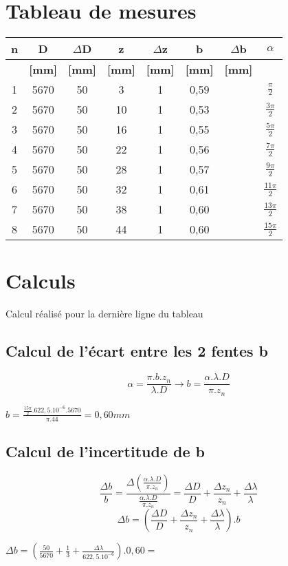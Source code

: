 \documentclass[11pt,a4paper]{report}
\begin{document}
	\section{Tableau de mesures}
	\begin{tabular}{|c|c|c|c|c|c|c|c|}
		\hline
		\bf n & \bf D & \bf $\Delta$D & \bf z & \bf $\Delta$z & \bf b & \bf $\Delta$b & \bf $\alpha$ \\
		\hline
		 & \bf [mm] & \bf [mm] & \bf [mm] & \bf [mm] & \bf [mm]  & \bf [mm]  &  \\
		\hline
		1 & 5670 & 50 & 3 &   1&0,59&  & $\frac{\pi}{2}$\\
		2 & 5670 & 50 & 10 &  1&0,53&  & $\frac{3\pi}{2}$\\
		3 & 5670 & 50 & 16 &  1&0,55&  & $\frac{5\pi}{2}$\\
		4 & 5670 & 50 & 22 &  1&0,56&  & $\frac{7\pi}{2}$\\
		5 & 5670 & 50 & 28 &  1&0,57&  & $\frac{9\pi}{2}$\\
		6 & 5670 & 50 & 32 &  1&0,61&  & $\frac{11\pi}{2}$\\
		7 & 5670 & 50 & 38 &  1&0,60&  & $\frac{13\pi}{2}$\\
		8 & 5670 & 50 & 44 &  1&0,60 &  & $\frac{15\pi}{2}$\\
		\hline
	\end{tabular}
	\section{Calculs}
		Calcul réalisé pour la dernière ligne du tableau
		\subsection{Calcul de l'écart entre les 2 fentes b}
		\begin{equation}
		\alpha = \frac{\pi.b.z_{n}}{\lambda.D} \rightarrow b = \frac{\alpha .\lambda.D }{\pi.z_{n}} 
		\end{equation}
\begin{center}$ b = \frac{\frac{15\pi}{2}.622,5.10^{-6}.5670}{\pi.44} = 0,60 mm$\end{center}
		\subsection{Calcul de l'incertitude de b}
		\begin{equation}
		\frac{\Delta b}{b} = \frac{\Delta\left(\frac{\alpha .\lambda.D }{\pi.z_{n}}\right)}{\frac{\alpha .\lambda.D }{\pi.z_{n}}} 
		= \frac{\Delta D}{D}+\frac{\Delta z_{n}}{z_{n}} + \frac{\Delta \lambda}{\lambda}
		\end{equation}
		\begin{equation}
		\Delta b
		= \left(\frac{\Delta D}{D}+\frac{\Delta z_{n}}{z_{n}} + \frac{\Delta \lambda}{\lambda}\right).b
		\end{equation}
		\begin{center}
		$\Delta b = \left(\frac{50}{5670}+\frac{1}{3} + \frac{\Delta \lambda}{622,5.10^{-6}}\right).0,60 = $
		\end{center}
\end{document}
